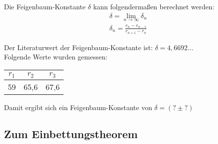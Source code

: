 Die Feigenbaum-Konstante \(\delta\) kann folgendermaßen berechnet werden: 
\begin{align}
    \delta = \lim_{n \to \infty} \delta_n \\
    \delta_n = \frac{r_n - r_{n-1}}{r_{n+1} -r_n}
\end{align}

Der Literaturwert der Feigenbaum-Konstante ist: \(\delta = 4,6692...\)\\

Folgende Werte wurden gemessen: \\
\begin{tabular}{c c c}
    $r_1$ & $r_2$ & $r_3$\\
    \hline
    59 & 65,6 & 67,6
\end{tabular}

Damit ergibt sich ein Feigenbaum-Konstante von \(\delta = (? \pm ?)\)

\subsection{Zum Einbettungstheorem}